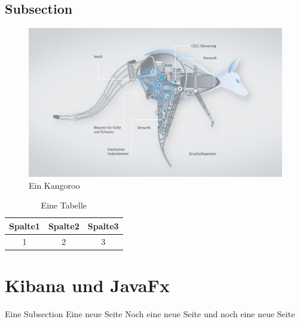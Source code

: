         \subsection{Subsection}
            \begin{figure}[h]
                \includegraphics[scale=0.2]{Abbildungen/Kapitel2/Kangoroo.png}
                \centering
                \caption{Ein Kangoroo}
                \label{Abb:Kangoroo}   
            \end{figure}  
             \begin{table}[h]
                \begin{tabular}{ccc}
                      \hline
                      Spalte1 & Spalte2 & Spalte3\\                      
                      \hline
                      1 & 2 & 3\\
                      \hline
                \end{tabular}
                \centering
                \caption{Eine Tabelle}
                \label{Tab:Tabelle1}
            \end{table}
 
        
        
    \section{Kibana und JavaFx}
        Eine Subsection
        \newpage
        Eine neue Seite
        \newpage 
        Noch eine neue Seite
        \newpage    
        und noch eine neue Seite